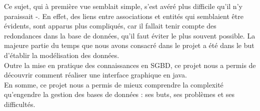 \documentclass{article}
\begin{document}
Ce sujet, qui à première vue semblait simple, s'est avéré plus difficile qu'il n'y paraissait -. En effet, des liens entre associations et entités qui semblaient être évidents, sont apparus plus compliqués, car il fallait tenir compte des redondances dans la base de données, qu'il faut éviter le plus souvent possible. La majeure partie du temps que nous avons consacré dans le projet a été dans le but d'établir la modélisation des données.  \\

Outre la mise en pratique des connaissances en SGBD, ce projet nous a permis de découvrir comment réaliser une interface graphique en java. \\

En somme, ce projet nous a permis de mieux comprendre la complexité qu'engendre la gestion des bases de données : ses buts, ses problèmes et ses difficultés. 
\end{document}
